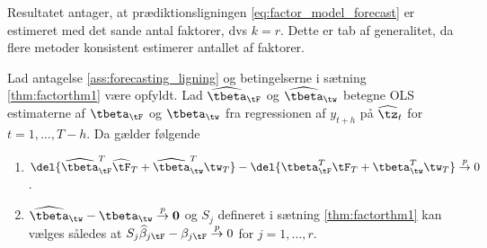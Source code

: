 Resultatet antager, at prædiktionsligningen \eqref{eq:factor_model_forecast} er estimeret med det sande antal faktorer, dvs \(k=r\).
Dette er tab af generalitet, da flere metoder konsistent estimerer antallet af faktorer.
%
\begin{thm} \label{thm:factorthm2}
Lad antagelse \ref{ass:forecasting_ligning} og betingelserne i sætning \ref{thm:factorthm1} være opfyldt. 
Lad \(\widehat{\tbeta}_{\tF}\) og \(\widehat{\tbeta}_{\tw}\) betegne OLS estimaterne af \(\tbeta_{\tF}\) og \(\tbeta_{\tw}\) fra regressionen af \(y_{t+h}\) på \(\widehat{\tz}_t\) for \(t=1, \ldots, T-h\). Da gælder følgende
\begin{enumerate}[label=\alph*)]
\item \(\del{\widehat{\tbeta}_{\tF}^T \widehat{\tF}_T + \widehat{\tbeta}^T_{\tw} \tw_T} - \del{\tbeta_{\tF}^T \tF_T + \tbeta_{\tw}^T \tw_T} \overset{p}{\rightarrow} 0\).
\item \(\widehat{\tbeta}_{\tw} - \tbeta_{\tw} \overset{p}{\rightarrow} \mathbf{0}\) og \(S_j\) defineret i sætning \ref{thm:factorthm1} kan vælges således at \(S_j \widehat{\beta}_{j \tF} - \beta_{j \tF} \overset{p}{\rightarrow} 0\) for \(j = 1, \ldots, r\).
\end{enumerate}
\end{thm}
%
